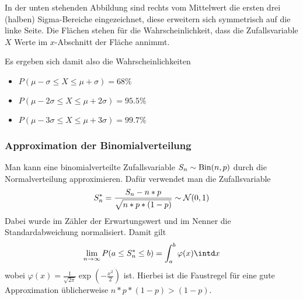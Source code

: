 In der unten stehenden Abbildung sind rechts vom Mittelwert die ersten drei (halben) Sigma-Bereiche eingezeichnet, diese erweitern sich symmetrisch auf die linke Seite. Die Flächen stehen für die Wahrscheinlichkeit, dass die Zufallsvariable $X$ Werte im $x$-Abschnitt der Fläche annimmt.
\begin{center}
\end{center}
Es ergeben sich damit also die Wahrscheinlichkeiten
\begin{itemize}
	\item $P(\mu-\sigma\leq X\leq \mu+\sigma)=68\%$
	\item $P(\mu-2\sigma\leq X\leq \mu+2\sigma)=95.5\%$
	\item $P(\mu-3\sigma\leq X\leq \mu+3\sigma)=99.7\%$
\end{itemize}



\subsubsection{Approximation der Binomialverteilung}
Man kann eine binomialverteilte Zufallsvariable $S_n\sim\operatorname{Bin}(n,p)$ durch die Normalverteilung approximieren. Dafür verwendet man die Zufallsvariable
\begin{equation*}
	S_n^\ast = \frac{S_n-n*p}{\sqrt{n*p*(1-p)}}\sim\mathcal{N}(0,1)
\end{equation*}
Dabei wurde im Zähler der Erwartungswert und im Nenner die Standardabweichung normalisiert.
Damit gilt
\begin{equation*}
	\lim_{n\to\infty} P(a\leq S_n^\ast \leq b)=\int_a^b \varphi(x)\intd x
\end{equation*}
wobei $\varphi(x)=\frac{1}{\sqrt{2\pi}} \exp(-\frac{x^2}{2})$ ist.
Hierbei ist die Faustregel für eine gute Approximation üblicherweise $n*p*(1-p)>(1-p)$.

